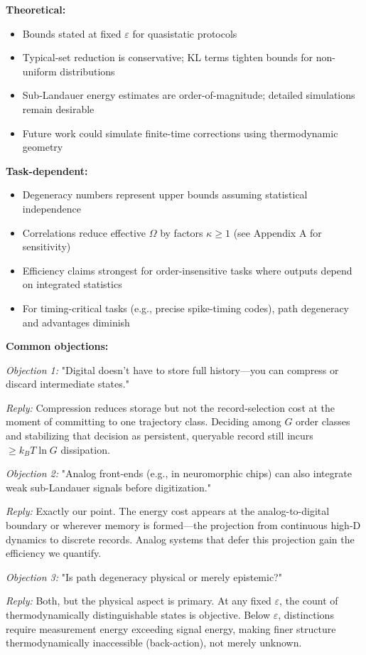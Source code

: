 \documentclass[12pt]{article}
\numberwithin{equation}{section}
\begin{document}
\textbf{Theoretical:}
\begin{itemize}
\item Bounds stated at fixed $\varepsilon$ for quasistatic protocols
\item Typical-set reduction is conservative; KL terms tighten bounds for non-uniform distributions
\item Sub-Landauer energy estimates are order-of-magnitude; detailed simulations remain desirable
\item Future work could simulate finite-time corrections using thermodynamic geometry \cite{sivak2012}
\end{itemize}

\textbf{Task-dependent:}
\begin{itemize}
\item Degeneracy numbers represent upper bounds assuming statistical independence
\item Correlations reduce effective $\Omega$ by factors $\kappa \ge 1$ (see Appendix A for sensitivity)
\item Efficiency claims strongest for order-insensitive tasks where outputs depend on integrated statistics
\item For timing-critical tasks (e.g., precise spike-timing codes), path degeneracy and advantages diminish
\end{itemize}

\textbf{Common objections:}

\emph{Objection 1:} "Digital doesn't have to store full history—you can compress or discard intermediate states."

\emph{Reply:} Compression reduces storage but not the record-selection cost at the moment of committing to one trajectory class. Deciding among $G$ order classes and stabilizing that decision as persistent, queryable record still incurs $\ge k_BT\ln G$ dissipation.

\emph{Objection 2:} "Analog front-ends (e.g., in neuromorphic chips) can also integrate weak sub-Landauer signals before digitization."

\emph{Reply:} Exactly our point. The energy cost appears at the analog-to-digital boundary or wherever memory is formed—the projection from continuous high-D dynamics to discrete records. Analog systems that defer this projection gain the efficiency we quantify.

\emph{Objection 3:} "Is path degeneracy physical or merely epistemic?"

\emph{Reply:} Both, but the physical aspect is primary. At any fixed $\varepsilon$, the count of thermodynamically distinguishable states is objective. Below $\varepsilon$, distinctions require measurement energy exceeding signal energy, making finer structure thermodynamically inaccessible (back-action), not merely unknown.
\end{document}
